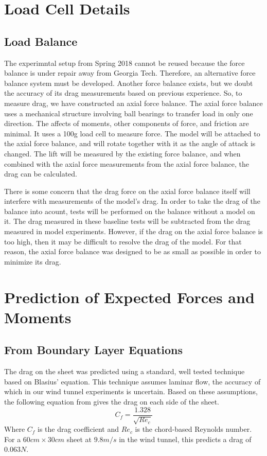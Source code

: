 \documentclass[12pt]{report} %
\begin{document}
\section{Load Cell Details}
\subsection{Load Balance}
The experimntal setup from Spring 2018 cannot be reused because the force balance is under repair away from Georgia Tech. Therefore, an alternative
force balance system must be developed. Another force balance exists, but we doubt the accuracy of its drag measurements based on previous experience. So, to measure drag, we have constructed an axial force balance. The axial force balance uses a mechanical structure involving ball bearings
to transfer load in only one direction. The affects of moments, other components of force, and friction are minimal. It uses a 100g load cell
to measure force. The model will be attached to the axial force balance, and will rotate together with it as the angle of attack is changed.
The lift will be measured by the existing force balance, and when combined with the axial force measurements from the axial force balance,
the drag can be calculated.

There is some concern that the drag force on the axial force balance itself will interfere with measurements of the model's drag. In order to
take the drag of the balance into acount, tests will be performed on the balance without a model on it. The drag measured in these baseline tests
will be subtracted from the drag measured in model experiments. However, if the drag on the axial force balance is too high, then it may be difficult
to resolve the drag of the model. For that reason, the axial force balance was designed to be as small as possible in order to minimize its drag.

\section{Prediction of Expected Forces and Moments}

\subsection{From Boundary Layer Equations}
The drag on the sheet was predicted using a standard, well tested technique based on Blasius' equation. This technique assumes laminar flow,
the accuracy of which in our wind tunnel experiments is uncertain. Based on these assumptions, the following equation from \cite{Anderson} gives
the drag on each side of the sheet.
\[ C_f = \frac{1.328}{\sqrt{Re_c}} \]
Where $C_f$ is the drag coefficient and $Re_c$ is the chord-based Reynolds number. For a $60cm \times 30cm$ sheet at $9.8m/s$ in the wind
tunnel, this predicts a drag of $0.063N$.
\end{document}
